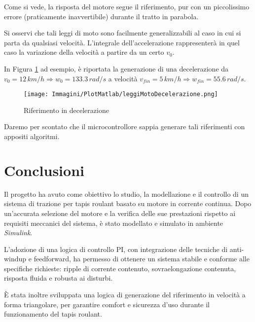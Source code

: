 \documentclass[a4paper,12pt]{article}
\begin{document}
\vspace{0.5cm}

Come si vede, la risposta del motore segue il riferimento, pur con un piccolissimo errore (praticamente inavvertibile) durante il tratto in parabola.

\vspace{0.3cm}

Si osservi che tali leggi di moto sono facilmente generalizzabili al caso in cui si parta da qualsiasi velocità. L'integrale dell'accelerazione rappresenterà in quel caso la variazione della velocità a partire da un certo $v_0$.

In Figura \ref{fig: decelazione} ad esempio, è riportata la generazione di una decelerazione da $v_0=12\,km/h \Rightarrow w_{0}=133.3\,rad/s $ a velocità $v_{fin}=5\,km/h\Rightarrow w_{fin}=55.6\,rad/s$.

\vspace{0.5cm}

\begin{figure}[h!]
    \centering
    \texttt{[image: Immagini/PlotMatlab/leggiMotoDecelerazione.png]}
    \caption{Riferimento in decelerazione}
    \label{fig: decelazione}
\end{figure}

\vspace{0.5cm}

Daremo per scontato che il microcontrollore sappia generare tali riferimenti con appositi algoritmi.

\newpage


\section{Conclusioni}

Il progetto ha avuto come obiettivo lo studio, la modellazione e il controllo di un sistema di trazione per tapis roulant basato su motore in corrente continua. Dopo un’accurata selezione del motore e la verifica delle sue prestazioni rispetto ai requisiti meccanici del sistema, è stato modellato e simulato in ambiente \textit{Simulink}.

L'adozione di una logica di controllo PI, con integrazione delle tecniche di anti-windup e feedforward, ha permesso di ottenere un sistema stabile e conforme alle specifiche richieste: ripple di corrente contenuto, sovraelongazione contenuta, risposta fluida e robusta ai disturbi.

È stata inoltre sviluppata una logica di generazione del riferimento in velocità a forma triangolare, per garantire comfort e sicurezza d'uso durante il funzionamento del tapis roulant.
\end{document}
